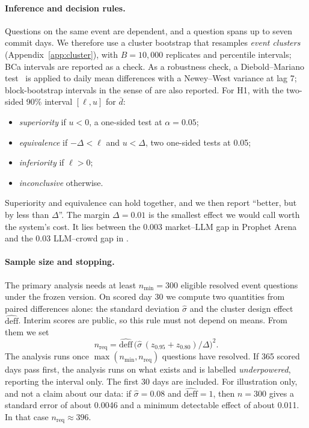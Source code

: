 \documentclass[11pt]{article}
\begin{document}
\paragraph{Inference and decision rules.} Questions on the same event are dependent, and a question spans up to seven commit days. We therefore use a cluster bootstrap that resamples \emph{event clusters} (Appendix~\ref{app:cluster}), with $B=10{,}000$ replicates and percentile intervals; BCa intervals are reported as a check. As a robustness check, a Diebold--Mariano test~\citep{diebold1995comparing} is applied to daily mean differences with a Newey--West variance at lag 7; block-bootstrap intervals in the sense of \citet{kunsch1989jackknife} are also reported. For H1, with the two-sided 90\% interval $[\ell,u]$ for $\bar d$:
\begin{itemize}
  \item \emph{superiority} if $u<0$, a one-sided test at $\alpha=0.05$;
  \item \emph{equivalence} if $-\Delta<\ell$ and $u<\Delta$, two one-sided tests at 0.05;
  \item \emph{inferiority} if $\ell>0$;
  \item \emph{inconclusive} otherwise.
\end{itemize}
Superiority and equivalence can hold together, and we then report ``better, but by less than $\Delta$''. The margin $\Delta=0.01$ is the smallest effect we would call worth the system's cost. It lies between the 0.003 market--LLM gap in Prophet Arena~\citep{yang2025prophet} and the 0.03 LLM--crowd gap in \citet{halawi2024approaching}.

\paragraph{Sample size and stopping.} The primary analysis needs at least $n_{\min}=300$ eligible resolved event questions under the frozen version. On scored day 30 we compute two quantities from paired differences alone: the standard deviation $\hat\sigma$ and the cluster design effect $\widehat{\mathrm{deff}}$. Interim scores are public, so this rule must not depend on means. From them we set
\[
n_{\mathrm{req}}=\widehat{\mathrm{deff}}\,\big(\hat\sigma\,(z_{0.95}+z_{0.80})/\Delta\big)^2 .
\]
The analysis runs once $\max(n_{\min},n_{\mathrm{req}})$ questions have resolved. If 365 scored days pass first, the analysis runs on what exists and is labelled \emph{underpowered}, reporting the interval only. The first 30 days are included. For illustration only, and not a claim about our data: if $\hat\sigma=0.08$ and $\widehat{\mathrm{deff}}=1$, then $n=300$ gives a standard error of about 0.0046 and a minimum detectable effect of about 0.011. In that case $n_{\mathrm{req}}\approx 396$.
\end{document}
